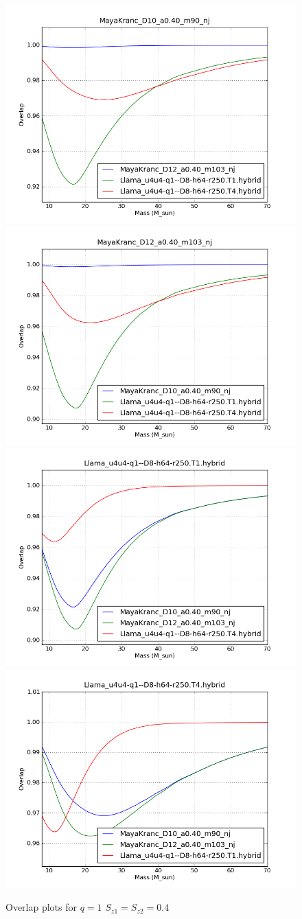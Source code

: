 \begin{figure}
  \includegraphics[width=0.5\linewidth]{figures/ninja2/figure_1_0d4_03.png} 
  \includegraphics[width=0.5\linewidth]{figures/ninja2/figure_1_0d4_06.png} \\
  \includegraphics[width=0.5\linewidth]{figures/ninja2/figure_1_0d4_09.png} 
  \includegraphics[width=0.5\linewidth]{figures/ninja2/figure_1_0d4_12.png} \\
  \caption[Overlap plots for $q=1$ $S_{z1} = S_{z2} = 0.4$]{
  \label{f:figure_1_0d4}
Overlap plots for $q=1$ $S_{z1} = S_{z2} = 0.4$}
\end{figure}%


